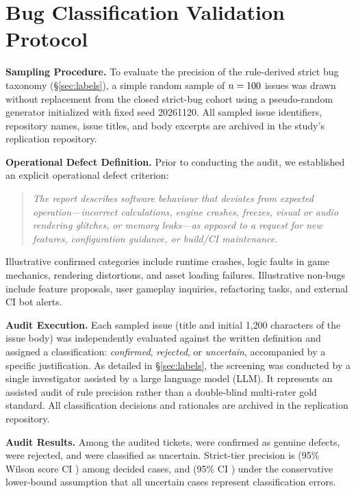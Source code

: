 \section{Bug Classification Validation Protocol}\label{app:validation}

\textbf{Sampling Procedure.} To evaluate the precision of the rule-derived strict bug taxonomy (\S\ref{sec:labels}), a simple random sample of $n=100$ issues was drawn without replacement from the closed strict-bug cohort using a pseudo-random generator initialized with fixed seed 20261120. All sampled issue identifiers, repository names, issue titles, and body excerpts are archived in the study's replication repository.

\textbf{Operational Defect Definition.} Prior to conducting the audit, we established an explicit operational defect criterion:
\begin{quote}
\emph{The report describes software behaviour that deviates from expected operation---incorrect calculations, engine crashes, freezes, visual or audio rendering glitches, or memory leaks---as opposed to a request for new features, configuration guidance, or build/CI maintenance.}
\end{quote}
Illustrative confirmed categories include runtime crashes, logic faults in game mechanics, rendering distortions, and asset loading failures. Illustrative non-bugs include feature proposals, user gameplay inquiries, refactoring tasks, and external CI bot alerts.

\textbf{Audit Execution.} Each sampled issue (title and initial 1{,}200 characters of the issue body) was independently evaluated against the written definition and assigned a classification: \emph{confirmed}, \emph{rejected}, or \emph{uncertain}, accompanied by a specific justification. As detailed in \S\ref{sec:labels}, the screening was conducted by a single investigator assisted by a large language model (LLM). It represents an assisted audit of rule precision rather than a double-blind multi-rater gold standard. All classification decisions and rationales are archived in the replication repository.

\textbf{Audit Results.} Among the \valvN{} audited tickets, \valvConf{} were confirmed as genuine defects, \valvRej{} were rejected, and \valvUnc{} were classified as uncertain. Strict-tier precision is \valvPrec{} (95\% Wilson score CI \valvCI) among decided cases, and \valvPrecAll{} (95\% CI \valvCIAll) under the conservative lower-bound assumption that all uncertain cases represent classification errors.
